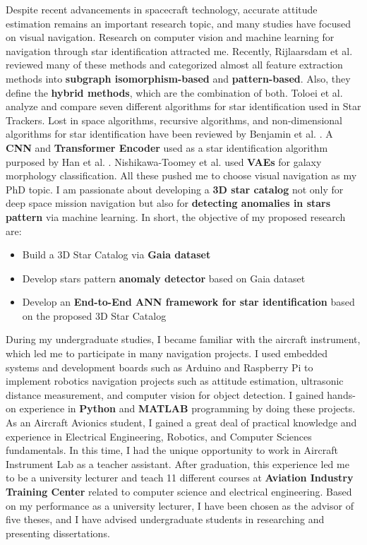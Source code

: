 \documentclass[a4,15pt]{article}
\begin{document}
\begin{large}
\quad Despite recent advancements in spacecraft technology, accurate attitude estimation remains an important research topic, and many studies have focused on visual navigation. Research on computer vision and machine learning for navigation through star identification attracted me. 
Recently, Rijlaarsdam et al. \cite{rijlaarsdam2020survey} reviewed many of these methods and categorized almost all feature extraction methods into  \textbf{subgraph isomorphism-based} and  \textbf{pattern-based}. Also, they define the  \textbf{hybrid methods}, which are the combination of both. Toloei et al. \cite{toloei2020comparative} analyze and compare seven different algorithms for star identification used in Star Trackers. Lost in space algorithms, recursive algorithms, and non-dimensional algorithms for star identification have been reviewed by Benjamin et al. \cite{spratling2009survey}. A  \textbf{CNN} and  \textbf{Transformer Encoder} used as a star identification algorithm purposed by Han et al. \cite {han2021end}. Nishikawa-Toomey et al. \cite{nishikawa2020semi} used  \textbf{VAEs} for galaxy morphology classification. 
All these pushed me to choose visual navigation as my PhD topic. I am passionate about developing a  \textbf{3D star catalog} not only for deep space mission navigation but also for  \textbf{detecting anomalies in stars pattern} via machine learning.
In short, the objective of my proposed research are:
\begin{itemize}
    \item 	Build a 3D Star Catalog via  \textbf{Gaia dataset} \cite{brown2021gaia} \vspace{-0.3cm}
    \item 	Develop stars pattern  \textbf{anomaly detector} based on Gaia dataset \vspace{-0.3cm}
    \item 	Develop an  \textbf{End-to-End ANN framework for star identification} based on the proposed 3D Star Catalog
\end{itemize}
 \par

\quad During my undergraduate studies, I became familiar with the aircraft instrument, which led me to participate in many navigation projects. I used embedded systems and development boards such as Arduino and Raspberry Pi to implement robotics navigation projects such as attitude estimation, ultrasonic distance measurement, and computer vision for object detection. I gained hands-on experience in  \textbf{Python} and  \textbf{MATLAB} programming by doing these projects. As an Aircraft Avionics student, I gained a great deal of practical knowledge and experience in Electrical Engineering, Robotics, and Computer Sciences fundamentals. In this time, I had the unique opportunity to work in Aircraft Instrument Lab as a teacher assistant. After graduation, this experience led me to be a university lecturer and teach 11 different courses at  \textbf{Aviation Industry Training Center} related to computer science and electrical engineering. Based on my performance as a university lecturer, I have been chosen as the advisor of five theses, and I have advised undergraduate students in researching and presenting dissertations.  \par


\end{large}
\end{document}

